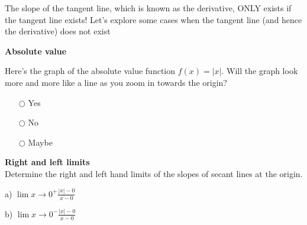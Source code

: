 \documentclass[pdftex, brazil, 12pt, twoside]{article}
\begin{document}
The slope of the tangent line, which is known as the derivative, ONLY exists if
the tangent line exists! Let's explore some cases when the tangent line (and hence
the derivative) does not exist

\begin{exercise}
  \textbf{Absolute value}\\%
  \begin{figure}[H]
    \begin{center}
    \end{center}
  \end{figure}
  Here's the graph of the absolute value function $f(x) = |x|$. Will the graph look
  more and more like a line as you zoom in towards the origin?
  \begin{itemize}[noitemsep]
  \item[$\bigcirc$] Yes
  \item[$\bigcirc$] No
  \item[$\bigcirc$] Maybe
  \end{itemize}
\end{exercise}

\begin{exercise}
  \textbf{Right and left limits}\\%
  Determine the right and left hand limits of the slopes of secant lines at the origin.
  \begin{figure}[H]
    \begin{center}
    \end{center}
  \end{figure}
  a) $\displaystyle \lim{x \to 0^+}{\frac{|x|-0}{x-0}}$

  b) $\displaystyle \lim{x \to 0^-}{\frac{|x|-0}{x-0}}$
\end{exercise}
\end{document}
